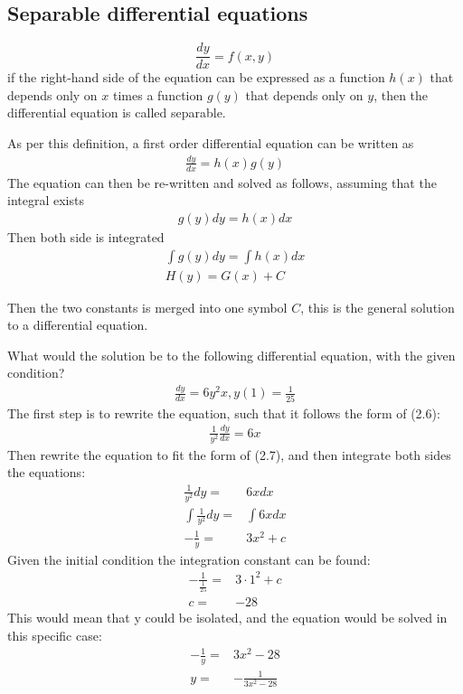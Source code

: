 \subsection{Separable differential equations} \label{SDE}
\begin{tcolorbox}[colback=blue!5!white,colframe=blue!75!black,title=Definition: Separable equation] 
    $$\frac{dy}{dx} = f(x,y)$$
    if the right-hand side of the equation can be expressed as   a function $h(x)$ that depends only on $x$ times a function $g(y)$ that depends only on $y$, then the differential equation is called separable.
   \end{tcolorbox}
As per this definition, a first order differential equation can be written as
\begin{align}
	\frac{dy}{dx}=h(x)g(y)
\end{align}
The equation can then be re-written and solved as follows, assuming that the integral exists
\begin{align}
	g(y)dy=h(x)dx
\end{align}
Then both side is integrated
 \begin{align}
 \int g(y)dy =\int h(x)dx   \\
 H(y)=G(x)+C
 \end{align}
 
Then the two constants is merged into one symbol $C$, this is the general solution to a differential equation. \citep{diffandcomplex}

\begin{tcolorbox}[colback=red!5!white,colframe=red!75!black,title=Example using separable differential equation] 
What would the solution be to the following differential equation, with the given condition?
\begin{align*}
	\frac{dy}{dx} = 6y^2x, y(1)=\frac{1}{25}
\end{align*}
The first step is to rewrite the equation, such that it follows the form of (2.6):
\begin{align*}
	\frac{1}{y^2}\frac{dy}{dx}=6x
\end{align*}
Then rewrite the equation to fit the form of (2.7), and then integrate both sides the equations:
\begin{align*}
	\frac{1}{y^2}dy=&6x dx				\\
	\int \frac{1}{y^2}dy=&\int 6x dx		\\
	-\frac{1}{y}=&3x^2+c		
\end{align*}
Given the initial condition the integration constant can be found:
\begin{align*}
	-\frac{1}{\frac{1}{25}}=&3\cdot 1^2+c	\\
	c=&-28
\end{align*}
This would mean that y could be isolated, and the equation would be solved in this specific case:
\begin{align*}
	-\frac{1}{y}=&3x^2-28\\
	y=&-\frac{1}{3x^2-28}
\end{align*}
\end{tcolorbox}